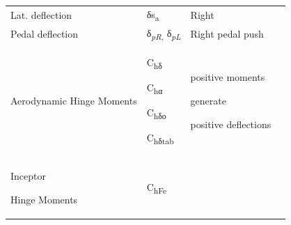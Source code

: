 \documentclass[
]{book}
\begin{document}
\begin{longtable}[]{@{}llll@{}}
\begin{minipage}[t]{0.41\columnwidth}
Lat. deflection\strut
\end{minipage} & \begin{minipage}[t]{0.14\columnwidth}\raggedright
δs\textsubscript{a}\strut
\end{minipage} & \begin{minipage}[t]{0.17\columnwidth}\raggedright
Right\strut
\end{minipage} & \begin{minipage}[t]{0.17\columnwidth}\raggedright
\strut
\end{minipage}\tabularnewline
\begin{minipage}[t]{0.41\columnwidth}\raggedright
Pedal deflection\strut
\end{minipage} & \begin{minipage}[t]{0.14\columnwidth}\raggedright
δ\textsubscript{\emph{pR},} δ\emph{\textsubscript{pL}}\strut
\end{minipage} & \begin{minipage}[t]{0.17\columnwidth}\raggedright
Right pedal push\strut
\end{minipage} & \begin{minipage}[t]{0.17\columnwidth}\raggedright
\strut
\end{minipage}\tabularnewline
\begin{minipage}[t]{0.41\columnwidth}\raggedright
Aerodynamic Hinge Moments\strut
\end{minipage} & \begin{minipage}[t]{0.14\columnwidth}\raggedright
C\textsubscript{hδ}

C\textsubscript{hα}

C\textsubscript{hδο}

C\textsubscript{hδtab}\strut
\end{minipage} & \begin{minipage}[t]{0.17\columnwidth}\raggedright
positive moments

generate

positive deflections\strut
\end{minipage} & \begin{minipage}[t]{0.17\columnwidth}\raggedright
\strut
\end{minipage}\tabularnewline
\begin{minipage}[t]{0.41\columnwidth}\raggedright
Inceptor

Hinge Moments\strut
\end{minipage} & \begin{minipage}[t]{0.14\columnwidth}\raggedright
C\textsubscript{hFe}


\end{minipage}
\end{longtable}
\end{document}
